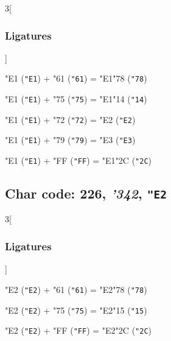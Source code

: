 \documentclass{article}
\newlength{\maxcharwidth}
\begin{document}
\begin{multicols}{3}[\subsubsection{Ligatures}]

{\testfont\char"E1\noboundary} ({\tt"E1}) + {\testfont\char"61\noboundary} ({\tt"61}) = {\testfont\char"E1\noboundary}{\testfont\char"78\noboundary} ({\tt"78}) 

{\testfont\char"E1\noboundary} ({\tt"E1}) + {\testfont\char"75\noboundary} ({\tt"75}) = {\testfont\char"E1\noboundary}{\testfont\char"14\noboundary} ({\tt"14}) 

{\testfont\char"E1\noboundary} ({\tt"E1}) + {\testfont\char"72\noboundary} ({\tt"72}) = {\testfont\char"E2\noboundary} ({\tt"E2}) 

{\testfont\char"E1\noboundary} ({\tt"E1}) + {\testfont\char"79\noboundary} ({\tt"79}) = {\testfont\char"E3\noboundary} ({\tt"E3}) 

{\testfont\char"E1\noboundary} ({\tt"E1}) + {\testfont\char"FF\noboundary} ({\tt"FF}) = {\testfont\char"E1\noboundary}{\testfont\char"2C\noboundary} ({\tt"2C}) 

\end{multicols}

\subsection{Char code: 226, {\it'342}, {\tt"E2}}
\label{char_226}


\begin{multicols}{3}[\subsubsection{Ligatures}]

{\testfont\char"E2\noboundary} ({\tt"E2}) + {\testfont\char"61\noboundary} ({\tt"61}) = {\testfont\char"E2\noboundary}{\testfont\char"78\noboundary} ({\tt"78}) 

{\testfont\char"E2\noboundary} ({\tt"E2}) + {\testfont\char"75\noboundary} ({\tt"75}) = {\testfont\char"E2\noboundary}{\testfont\char"15\noboundary} ({\tt"15}) 

{\testfont\char"E2\noboundary} ({\tt"E2}) + {\testfont\char"FF\noboundary} ({\tt"FF}) = {\testfont\char"E2\noboundary}{\testfont\char"2C\noboundary} ({\tt"2C}) 

\end{multicols}
\end{document}
